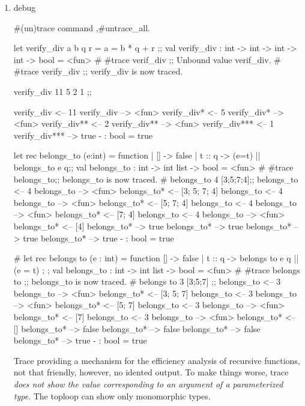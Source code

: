 \begin{enumerate}
\begin{enumerate}
\item debug

  \#(un)trace command ,\#untrace\_all.
  \begin{alternate}
let verify_div a b q r = a = b * q + r ;;
val verify_div : int -> int -> int -> int -> bool = <fun>
# #trace verif_div ;;
Unbound value verif_div.
# #trace verify_div ;;
verify_div is now traced.
\end{alternate}

\begin{ocamlcode}
verify_div 11 5 2 1 ;;  
\end{ocamlcode}


\begin{ocamlcode}
verify_div <-- 11
verify_div --> <fun>
verify_div* <-- 5
verify_div* --> <fun>
verify_div** <-- 2
verify_div** --> <fun>
verify_div*** <-- 1
verify_div*** --> true
- : bool = true  
\end{ocamlcode}

\begin{bluetext}
let rec belongs_to (e:int) = function 
    | [] -> false 
    | t :: q -> (e=t) || belongs_to e q;;
    val belongs_to : int -> int list -> bool = <fun>
# #trace belongs_to;;
belongs_to is now traced.
# belongs_to 4 [3;5;7;4];;
belongs_to <-- 4
belongs_to --> <fun>
belongs_to* <-- [3; 5; 7; 4]
belongs_to <-- 4
belongs_to --> <fun>
belongs_to* <-- [5; 7; 4]
belongs_to <-- 4
belongs_to --> <fun>
belongs_to* <-- [7; 4]
belongs_to <-- 4
belongs_to --> <fun>
belongs_to* <-- [4]
belongs_to* --> true
belongs_to* --> true
belongs_to* --> true
belongs_to* --> true
- : bool = true
\end{bluetext}

\begin{bluetext}
# let rec belongs to (e : int) = function
[] -> false
| t :: q -> belongs to e q || (e = t) ; ;
val belongs_to : int -> int list -> bool = <fun> # #trace belongs to ;;
belongs_to is now traced.
# belongs to 3 [3;5;7] ;;
belongs_to <-- 3
belongs_to --> <fun>
belongs_to* <-- [3; 5; 7]
belongs_to <-- 3
belongs_to --> <fun>
belongs_to* <-- [5; 7]
belongs_to <-- 3
belongs_to --> <fun>
belongs_to* <-- [7]
belongs_to <-- 3
belongs_to --> <fun>
belongs_to* <-- []
belongs_to* --> false
belongs_to* --> false
belongs_to* --> false
belongs_to* --> true
- : bool = true  
\end{bluetext}


Trace providing a mechanism for the efficiency analysis of recursive functions, not that friendly, however, no idented output.
To make things worse, trace \textit{does not show the value corresponding to an argument of a parameterized type}. The toploop can show
only monomorphic types.


\end{enumerate}
\end{enumerate}
